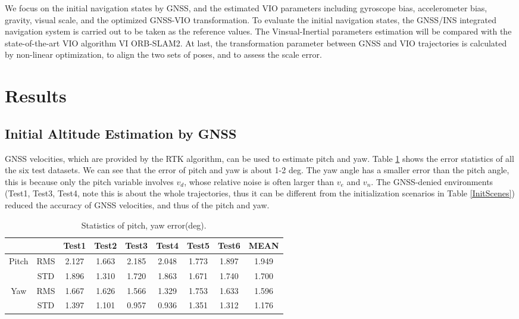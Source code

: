 \documentclass[journal,article,submit,moreauthors,pdftex]{Definitions/mdpi}
\begin{document}
We focus on the initial navigation states by GNSS, and the estimated VIO 
parameters including gyroscope bias, accelerometer bias, gravity, visual 
scale, and the optimized GNSS-VIO transformation.
To evaluate the initial navigation states, the GNSS/INS integrated 
navigation system is carried out to be taken as the reference values.
The Vinsual-Inertial parameters estimation will be compared with the 
state-of-the-art VIO algorithm VI ORB-SLAM2\cite{mur-artalVisualInertialMonocularSLAM2017a}.
At last, the transformation parameter between GNSS and VIO 
trajectories is calculated by non-linear optimization, to align the 
two sets of poses, and to assess the scale error.

\section{Results}
\subsection{Initial Altitude Estimation by GNSS}
GNSS velocities, which are provided by the RTK algorithm, can be 
used to estimate pitch and yaw. 
Table \ref{GNSSInitStates} shows the error statistics of all the six 
test datasets.
We can see that the error of pitch and yaw is about 1-2 deg.
The yaw angle has a smaller error than the pitch angle, this is because only 
the pitch variable involves $v_d$, whose relative noise is often larger 
than $v_e$ and $v_n$.
The GNSS-denied environments (Test1, Test3, Test4, note this is about 
the whole trajectories, thus it can be different from the 
initialization scenarios in Table \ref{InitScenes}) reduced the 
accuracy of GNSS velocities, and thus of the pitch and yaw.
\begin{table}[H]
	\caption{Statistics of pitch, yaw error(deg).}
	\centering
	\begin{tabular}{ccccccccc}
		\toprule
		                       &     & Test1 & Test2 & Test3 & Test4 & Test5 & Test6 & MEAN  \\
		\midrule
		\multirow{2}{*}{Pitch} & RMS & 2.127 & 1.663 & 2.185 & 2.048 & 1.773 & 1.897 & 1.949 \\
		                       & STD & 1.896 & 1.310 & 1.720 & 1.863 & 1.671 & 1.740 & 1.700 \\
		\midrule
		\multirow{2}{*}{Yaw}   & RMS & 1.667 & 1.626 & 1.566 & 1.329 & 1.753 & 1.633 & 1.596 \\
		                       & STD & 1.397 & 1.101 & 0.957 & 0.936 & 1.351 & 1.312 & 1.176 \\
		\bottomrule
	\end{tabular}
	\label{GNSSInitStates}
\end{table}
\end{document}
